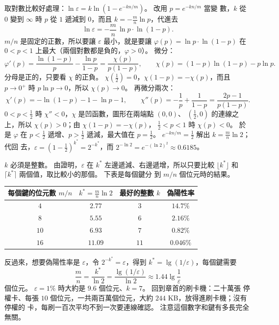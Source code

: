 \begin{whybox}
取對數比較好處理：$\ln \varepsilon = k \ln(1 - e^{-kn/m})$。 改用 $p = e^{-kn/m}$ 當變
數，$k$ 從 $0$ 變到 $\infty$ 時 $p$ 從 $1$ 遞減到 $0$，而且 $k = -\frac{m}{n} \ln p$，代進去
\[
\ln \varepsilon = -\frac{m}{n}\,\ln p \cdot \ln(1 - p).
\]
$m/n$ 是固定的正數，所以要讓 $\varepsilon$ 最小，就是要讓 $\varphi(p) = \ln p \cdot \ln(1 - p)$
在 $0 < p < 1$ 上最大（兩個對數都是負的，$\varphi > 0$）。 微分：
\[
\varphi'(p) = \frac{\ln(1 - p)}{p} - \frac{\ln p}{1 - p}
= \frac{\chi(p)}{p(1 - p)}, \qquad
\chi(p) = (1 - p)\ln(1 - p) - p \ln p .
\]
分母是正的，只要看 $\chi$ 的正負。 $\chi(\frac12) = 0$，$\chi(1 - p) = -\chi(p)$，而且
$p \to 0^{+}$ 時 $p \ln p \to 0$，所以 $\chi(p) \to 0$。 再微分兩次：
\[
\chi'(p) = -\ln(1 - p) - 1 - \ln p - 1, \qquad
\chi''(p) = -\frac{1}{p} + \frac{1}{1 - p} = \frac{2p - 1}{p(1 - p)}.
\]
$0 < p < \frac12$ 時 $\chi'' < 0$，$\chi$ 是凹函數，圖形在兩端點 $(0, 0)$、
$(\frac12, 0)$ 的連線之上，所以 $\chi(p) > 0$；由 $\chi(1 - p) = -\chi(p)$，
$\frac12 < p < 1$ 時 $\chi(p) < 0$。 於是 $\varphi$ 在 $p < \frac12$ 遞增、$p > \frac12$
遞減，最大值在 $p = \frac12$。 $e^{-kn/m} = \frac12$ 解出 $k = \frac{m}{n}\ln 2$；代回
去，$\varepsilon = (1 - \frac12)^{k^{*}} = 2^{-k^{*}}$，而 $2^{-\ln 2} = e^{-(\ln 2)^2}
\approx 0.6185$。
\end{whybox}

$k$ 必須是整數。 由證明，$\varepsilon$ 在 $k^{*}$ 左邊遞減、右邊遞增，所以只要比較
$\lfloor k^{*} \rfloor$ 和 $\lceil k^{*} \rceil$ 兩個值，取比較小的那個。 下表是每個鍵分
到 $m/n$ 個位元時的結果。

\begin{center}
\begin{tabular}{cccc}
\toprule
每個鍵的位元數 $m/n$ & $k^{*} = \frac{m}{n}\ln 2$ & 最好的整數 $k$ & 偽陽性率 \\
\midrule
$4$ & $2.77$ & $3$ & $14.7\%$ \\
$8$ & $5.55$ & $6$ & $2.16\%$ \\
$10$ & $6.93$ & $7$ & $0.82\%$ \\
$16$ & $11.09$ & $11$ & $0.046\%$ \\
\bottomrule
\end{tabular}
\end{center}

反過來，想要偽陽性率是 $\varepsilon$，令 $2^{-k^{*}} = \varepsilon$，得到
$k^{*} = \lg(1/\varepsilon)$，每個鍵需要
\[
\frac{m}{n} = \frac{k^{*}}{\ln 2} = \frac{\lg(1/\varepsilon)}{\ln 2} \approx 1.44 \lg \frac{1}{\varepsilon}
\]
個位元。 $\varepsilon = 1\%$ 時大約是 $9.6$ 個位元、$k = 7$。 回到章首的刷卡機：二十萬張
停權卡、每張 $10$ 個位元，一共兩百萬個位元，大約 $244$ KB，放得進刷卡機；沒有停權的
卡，每刷一百次平均不到一次要連線確認。 注意這個數字和鍵有多長完全無關。

